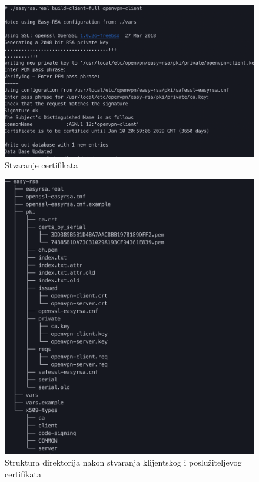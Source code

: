         \begin{figure}[H]
            \centering
            \includegraphics[scale=0.5]{slike/buildClientCert}
            \caption{Stvaranje certifikata}
        \end{figure}

        \begin{figure}[H]
            \centering
            \includegraphics[scale=0.5]{slike/afterClientAndServerCert}
            \caption{Struktura direktorija nakon stvaranja klijentskog i
            poslužiteljevog certifikata}
        \end{figure}

